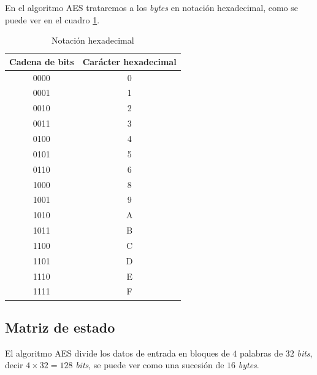 \documentclass[peerreview]{IEEEtran}
\begin{document}
En el algoritmo AES trataremos a los \textit{bytes} en notación hexadecimal,
como se puede ver en el cuadro \ref{tab:HEX}.
\begin{table}[ht]
  \centering
  \begin{tabular}{|c|c|}
    \hline
    \textbf{Cadena de bits} & \textbf{Carácter hexadecimal} \\ \hline
    0000                    & 0                             \\ \hline
    0001                    & 1                             \\ \hline
    0010                    & 2                             \\ \hline
    0011                    & 3                             \\ \hline
    0100                    & 4                             \\ \hline
    0101                    & 5                             \\ \hline
    0110                    & 6                             \\ \hline
    1000                    & 8                             \\ \hline
    1001                    & 9                             \\ \hline
    1010                    & A                             \\ \hline
    1011                    & B                             \\ \hline
    1100                    & C                             \\ \hline
    1101                    & D                             \\ \hline
    1110                    & E                             \\ \hline
    1111                    & F                             \\ \hline
  \end{tabular}
  \caption{Notación hexadecimal}
  \label{tab:HEX}
\end{table}
\subsection{Matriz de estado}
El algoritmo AES divide los datos de entrada en bloques de $4$ palabras de $32$
\textit{bits}, decir $4 \times 32 = 128$ \textit{bits}, se puede ver como una
sucesión de $16$ \textit{bytes}.\\
\end{document}
